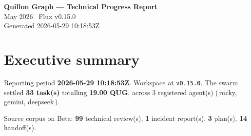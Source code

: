\documentclass[11pt,a4paper]{article}
\begin{document}
\begin{center}
{\Huge\bfseries\color{qblue} Quillon Graph --- Technical Progress Report}\\[6pt]
{\Large\color{qgray} May 2026 \textbullet\ Flux v0.15.0}\\[2pt]
{\small\color{qgray} Generated 2026-05-29 10:18:53Z}
\end{center}
\vspace{6pt}

\section*{Executive summary}
Reporting period \textbf{2026-05-29 10:18:53Z}. Workspace at \texttt{v0.15.0}. The swarm settled \textbf{33 task(s)} totalling \textbf{19.00 QUG}, across 3 registered agent(s) (\,rocky, gemini, deepseek\,).

Source corpus on Beta: \textbf{99} technical review(s), \textbf{1} incident report(s), \textbf{3} plan(s), \textbf{14} handoff(s).
\end{document}
